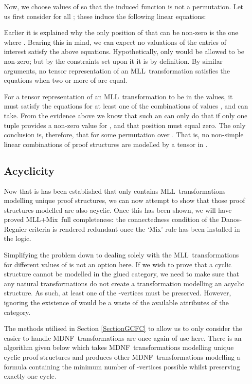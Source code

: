 \documentclass{LMCS}
\theoremstyle{plain}\newtheorem*{cLm}{Claim}
\newcommand{\mll}{MLL} \newcommand{\mall}{MALL}
\newcommand{\mllmix}{MLL+Mix} \newcommand{\GRel}{\mathbf{GRel}}
\newcommand{\p}{} \newcommand{\N}{\mathbb{N}}
\begin{document}
    \p Now, we choose values of  so that the induced function  is not a permutation. Let us first consider  for all ; these induce the following linear equations:
    
    Earlier it is explained why the only position of  that can be non-zero is the one where . Bearing this in mind, we can expect no valuations of the entries of interest satisfy the above equations. Hypothetically, only  would be allowed to be non-zero; but by the constraints set upon it it is  by definition. By similar arguments, no tensor representation of an \mll~transformation  satisfies the equations when two or more of  are equal.
    
    \p For a tensor representation of an \mll~transformation to be in the values, it must satisfy the  equations for at least one of the combinations of values ,  and  can take. From the evidence above we know that such an  can only do that if only one tuple  provides a non-zero value for , and that position must equal zero. The only conclusion is, therefore, that  for some permutation  over . That is, no non-simple linear combinations of proof structures are modelled by a tensor in .
    
    \subsection{Acyclicity} \label{SubsectionMixAcyclic}
    
    Now that is has been established that  only contains \mll~transformations modelling unique proof structures, we can now attempt to show that those proof structures modelled are also acyclic. Once this has been shown, we will have proved \mllmix~full completeness: the connectedness condition of the Danos-Regnier criteria is rendered redundant once the `Mix' rule has been installed in the logic.
    
    \p Simplifying the problem down to dealing solely with the \mll~transformations  for different values of  is not an option here. If we wish to prove that a cyclic structure cannot be modelled in the glued category, we need to make sure that any natural transformations do not create a transformation modelling an acyclic structure. As such, at least one of the -vertices must be preserved. However, ignoring the existence of  would be a waste of the available attributes of the category.
    
    \p The methods utilised in Section \ref{SectionGCFC} to allow us to only consider the easier-to-handle MDNF~transformations are once again of use here. There is an algorithm given below which takes MDNF~transformations modelling unique cyclic proof structures and produces other MDNF~transformations modelling a formula containing the minimum number of \linebreak -vertices possible whilst preserving exactly one cycle.
    
\end{document}
